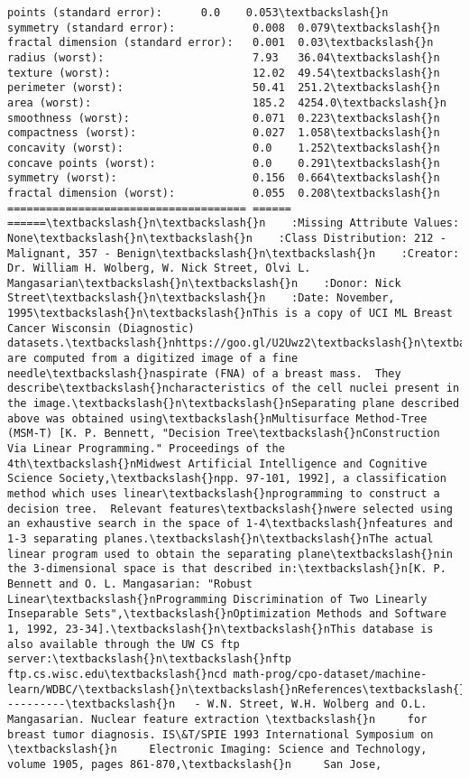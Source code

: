 \documentclass[11pt]{article}
\begin{document}
\begin{Verbatim}[commandchars=\\\{\}]
points (standard error):      0.0    0.053\textbackslash{}n    symmetry (standard error):            0.008  0.079\textbackslash{}n    fractal dimension (standard error):   0.001  0.03\textbackslash{}n    radius (worst):                       7.93   36.04\textbackslash{}n    texture (worst):                      12.02  49.54\textbackslash{}n    perimeter (worst):                    50.41  251.2\textbackslash{}n    area (worst):                         185.2  4254.0\textbackslash{}n    smoothness (worst):                   0.071  0.223\textbackslash{}n    compactness (worst):                  0.027  1.058\textbackslash{}n    concavity (worst):                    0.0    1.252\textbackslash{}n    concave points (worst):               0.0    0.291\textbackslash{}n    symmetry (worst):                     0.156  0.664\textbackslash{}n    fractal dimension (worst):            0.055  0.208\textbackslash{}n    ===================================== ====== ======\textbackslash{}n\textbackslash{}n    :Missing Attribute Values: None\textbackslash{}n\textbackslash{}n    :Class Distribution: 212 - Malignant, 357 - Benign\textbackslash{}n\textbackslash{}n    :Creator:  Dr. William H. Wolberg, W. Nick Street, Olvi L. Mangasarian\textbackslash{}n\textbackslash{}n    :Donor: Nick Street\textbackslash{}n\textbackslash{}n    :Date: November, 1995\textbackslash{}n\textbackslash{}nThis is a copy of UCI ML Breast Cancer Wisconsin (Diagnostic) datasets.\textbackslash{}nhttps://goo.gl/U2Uwz2\textbackslash{}n\textbackslash{}nFeatures are computed from a digitized image of a fine needle\textbackslash{}naspirate (FNA) of a breast mass.  They describe\textbackslash{}ncharacteristics of the cell nuclei present in the image.\textbackslash{}n\textbackslash{}nSeparating plane described above was obtained using\textbackslash{}nMultisurface Method-Tree (MSM-T) [K. P. Bennett, "Decision Tree\textbackslash{}nConstruction Via Linear Programming." Proceedings of the 4th\textbackslash{}nMidwest Artificial Intelligence and Cognitive Science Society,\textbackslash{}npp. 97-101, 1992], a classification method which uses linear\textbackslash{}nprogramming to construct a decision tree.  Relevant features\textbackslash{}nwere selected using an exhaustive search in the space of 1-4\textbackslash{}nfeatures and 1-3 separating planes.\textbackslash{}n\textbackslash{}nThe actual linear program used to obtain the separating plane\textbackslash{}nin the 3-dimensional space is that described in:\textbackslash{}n[K. P. Bennett and O. L. Mangasarian: "Robust Linear\textbackslash{}nProgramming Discrimination of Two Linearly Inseparable Sets",\textbackslash{}nOptimization Methods and Software 1, 1992, 23-34].\textbackslash{}n\textbackslash{}nThis database is also available through the UW CS ftp server:\textbackslash{}n\textbackslash{}nftp ftp.cs.wisc.edu\textbackslash{}ncd math-prog/cpo-dataset/machine-learn/WDBC/\textbackslash{}n\textbackslash{}nReferences\textbackslash{}n----------\textbackslash{}n   - W.N. Street, W.H. Wolberg and O.L. Mangasarian. Nuclear feature extraction \textbackslash{}n     for breast tumor diagnosis. IS\&T/SPIE 1993 International Symposium on \textbackslash{}n     Electronic Imaging: Science and Technology, volume 1905, pages 861-870,\textbackslash{}n     San Jose, 
\end{Verbatim}
\end{document}
